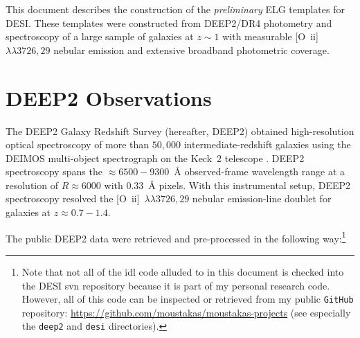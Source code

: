 \documentclass[12pt]{article}
\newcommand{\oiilam}{[O~{\sc ii}]~\ensuremath{\lambda\lambda3726,29}}
\begin{document}
This document describes the construction of the \emph{preliminary} ELG
templates for DESI.  These templates were constructed from DEEP2/DR4
photometry and spectroscopy of a large sample of galaxies at $z\sim1$
with measurable \oiilam{} nebular emission and extensive broadband
photometric coverage.

\section{DEEP2 Observations}

The DEEP2 Galaxy Redshift Survey (hereafter, DEEP2) obtained
high-resolution optical spectroscopy of more than $50,000$
intermediate-redshift galaxies using the DEIMOS multi-object
spectrograph on the Keck~2 telescope \citep{newman13a}.  DEEP2
spectroscopy spans the $\approx6500-9300$~\AA{} observed-frame
wavelength range at a resolution of $R\approx6000$ with $0.33$~\AA{}
pixels.  With this instrumental setup, DEEP2 spectroscopy resolved the
\oiilam{} nebular emission-line doublet for galaxies at
$z\approx0.7-1.4$.

The public DEEP2 data were retrieved and pre-processed in the
following way:\footnote{Note that not all of the {\sc idl} code
  alluded to in this document is checked into the DESI {\sc svn}
  repository because it is part of my personal research code.
  However, all of this code can be inspected or retrieved from my
  public {\tt GitHub} repository:
  \url{https://github.com/moustakas/moustakas-projects} (see
  especially the {\tt deep2} and {\tt desi} directories).}

\end{document}
